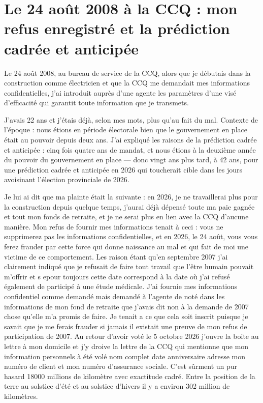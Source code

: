 \documentclass[12pt,letterpaper,oneside]{article}
\begin{document}
\section{Le 24 août 2008 à la CCQ : mon refus enregistré et la prédiction cadrée et anticipée}
Le 24 août 2008, au bureau de service de la CCQ, alors que je débutais dans
la construction comme électricien et que la CCQ me demandait mes informations
confidentielles, j'ai introduit auprès d'une agente les paramètres d'une visé
d'efficacité qui garantit toute information que je transmets.

J'avais 22 ans et j'étais déjà, selon mes mots, plus qu'au fait du mal.
Contexte de l'époque : nous étions en période électorale bien que le gouvernement en
place était au pouvoir depuis deux ans. J'ai expliqué les raisons de la prédiction
cadrée et anticipée : cinq fois quatre ans de mandat, et nous étions à la
deuxième année du pouvoir du gouvernement en place — donc vingt ans plus
tard, à 42 ans, pour une prédiction cadrée et anticipée en 2026 qui
toucherait cible dans les jours avoisinant l'élection provinciale de 2026.

Je lui ai dit que ma plainte était la suivante : en 2026, je ne travaillerai
plus pour la construction depuis quelque temps, j'aurai déjà dépensé toute ma
paie gagnée et tout mon fonds de retraite, et je ne serai plus en lien avec
la CCQ d'aucune manière. Mon refus de fournir mes informations tenait à
ceci : vous ne supprimerez pas les informations confidentielles, et en 2026,
le 24 août, vous vous ferez frauder par cette force qui donne naissance au
mal et qui fait de moi une victime de ce comportement. Les raison étant qu'en septembre 2007 
j'ai clairement indiqué que je refusait de faire tout travail que l'être humain pouvait m'offrir et s epour toujours
cette date correspond à la date où j'ai refusé également de participé à une étude médicale. J'ai fournie mes informations 
confidentiel comme demandé mais demandé à l'agente de noté dans les informations de mon fond de retraite que j'avais dit non à la 
demande de 2007 chose qu'elle m'a promis de faire. Je tenait a ce que cela soit inscrit puisque je savait que je me ferais frauder si jamais 
il existait une preuve de mon refus de participation de 2007. Au retour d'avoir voté le 5 octobre 2026 j'ouvre la boite au lettre à mon domicile et j'y droive la 
lettre de la CCQ qui mentionne que mon information personnels à été volé nom complet date anniversaire adresse mon numéro de client et mon numéro d'assurance sociale. C'est sûrment 
un pur hasard 18000 millions de kilomètre avec exactitude cadré. Entre la position de la terre au solstice d'été et au solstice d'hivers il y a environ 302 million de kilomètres.
\end{document}
